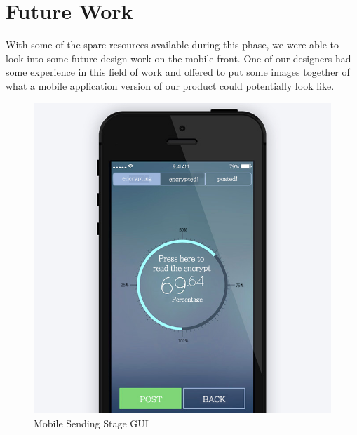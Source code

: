 \section{Future Work}
With some of the spare resources available during this phase, we were able to 
look into some future design work on the mobile front. One of our designers had
some experience in this field of work and offered to put some images together 
of what a mobile application version of our product could potentially look like. 

\begin{figure}[h]
    \centering
    \includegraphics[width=\textwidth]{images/design/mobile_send.jpg}
    \caption{Mobile Sending Stage GUI}
    \label{fig:mobile_send}
\end{figure}

